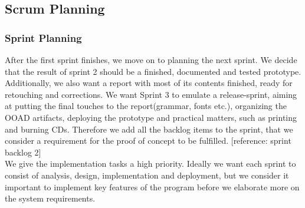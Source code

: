\subsection{Scrum Planning}
\subsubsection{Sprint Planning}
After the first sprint finishes, we move on to planning the next sprint. We decide that the result of sprint 2 should be a finished, documented and tested prototype. Additionally, we also want a report with most of its contents finished, ready for retouching and corrections. We want Sprint 3 to emulate a release-sprint, aiming at putting the final touches to the report(grammar, fonts etc.), organizing the OOAD artifacts, deploying the prototype and practical matters, such as printing and burning CDs. Therefore we add all the backlog items to the sprint, that we consider a requirement for the proof of concept to be fulfilled. [reference: sprint backlog 2]\\
We give the implementation tasks a high priority. Ideally we want each sprint to consist of analysis, design, implementation and deployment, but we consider it important to implement key features of the program before we elaborate more on the system requirements.\\
